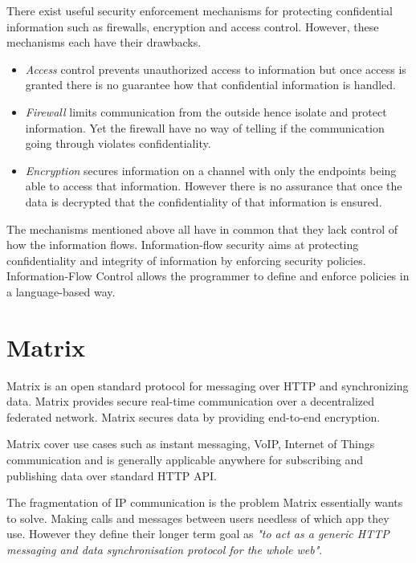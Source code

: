 There exist useful security enforcement mechanisms for protecting confidential information such as firewalls, encryption and access control. However, these mechanisms each have their drawbacks.

\begin{itemize}
	\item \emph{Access} control prevents unauthorized access to information but once access is granted there is no guarantee how that confidential information is handled.
	\item \emph{Firewall} limits communication from the outside hence isolate and protect information. Yet the firewall have no way of telling if the communication going through violates confidentiality.
	\item \emph{Encryption} secures information on a channel with only the endpoints being able to access that information. However there is no assurance that once the data is decrypted that the confidentiality of that information is ensured.
\end{itemize}

The mechanisms mentioned above all have in common that they lack control of how the information flows. Information-flow security aims at protecting confidentiality and integrity of information by enforcing security policies. Information-Flow Control allows the programmer to define and enforce policies in a language-based way\cite{Sabelfeld2003}. 



\section{Matrix}\label{matrix:intro}
Matrix is an open standard protocol for messaging over HTTP and synchronizing data. Matrix provides secure real-time communication over a decentralized federated network. Matrix secures data by providing end-to-end encryption.

Matrix cover use cases such as instant messaging, VoIP, Internet of Things communication and is generally applicable anywhere for subscribing and publishing data over standard HTTP API.
 
The fragmentation of IP communication is the problem Matrix essentially wants to solve. Making calls and messages between users needless of which app they use. However they define their longer term goal as \emph{"to act as a generic HTTP messaging and data synchronisation protocol for the whole web"}\cite{matrixfaq}.



